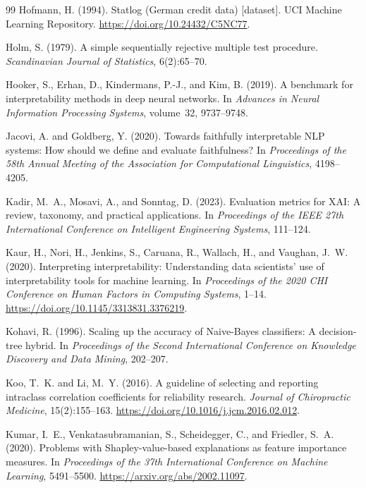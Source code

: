 \documentclass[fleqn,10pt,lineno]{wlpeerj}
\begin{document}
\begin{thebibliography}{99}
Hofmann, H. (1994).
Statlog ({German} credit data) [dataset].
UCI Machine Learning Repository.
\url{https://doi.org/10.24432/C5NC77}.

Holm, S. (1979).
A simple sequentially rejective multiple test procedure.
\emph{Scandinavian Journal of Statistics}, 6(2):65--70.

Hooker, S., Erhan, D., Kindermans, P.-J., and Kim, B. (2019).
A benchmark for interpretability methods in deep neural networks.
In \emph{Advances in Neural Information Processing Systems}, volume~32,
9737--9748.

Jacovi, A. and Goldberg, Y. (2020).
Towards faithfully interpretable {NLP} systems: How should we define and
evaluate faithfulness?
In \emph{Proceedings of the 58th Annual Meeting of the Association for
Computational Linguistics}, 4198--4205.

Kadir, M.~A., Mosavi, A., and Sonntag, D. (2023).
Evaluation metrics for XAI: A review, taxonomy, and practical applications.
In \emph{Proceedings of the IEEE 27th International Conference on
Intelligent Engineering Systems}, 111--124.

Kaur, H., Nori, H., Jenkins, S., Caruana, R., Wallach, H., and
Vaughan, J.~W. (2020).
Interpreting interpretability: Understanding data scientists' use of
interpretability tools for machine learning.
In \emph{Proceedings of the 2020 {CHI} Conference on Human Factors in
Computing Systems}, 1--14.
\url{https://doi.org/10.1145/3313831.3376219}.

Kohavi, R. (1996).
Scaling up the accuracy of Naive-Bayes classifiers: A decision-tree hybrid.
In \emph{Proceedings of the Second International Conference on Knowledge
Discovery and Data Mining}, 202--207.

Koo, T.~K. and Li, M.~Y. (2016).
A guideline of selecting and reporting intraclass correlation coefficients
for reliability research.
\emph{Journal of Chiropractic Medicine}, 15(2):155--163.
\url{https://doi.org/10.1016/j.jcm.2016.02.012}.

Kumar, I.~E., Venkatasubramanian, S., Scheidegger, C., and
Friedler, S.~A. (2020).
Problems with {Shapley}-value-based explanations as feature importance
measures.
In \emph{Proceedings of the 37th International Conference on Machine
Learning}, 5491--5500.
\url{https://arxiv.org/abs/2002.11097}.


\end{thebibliography}
\end{document}
